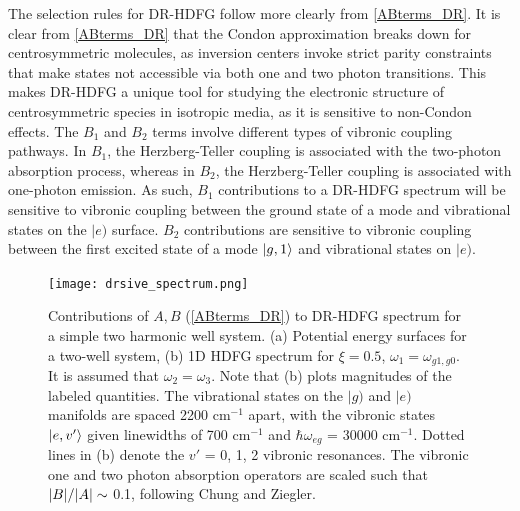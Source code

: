 \documentclass[aip, jcp, reprint, onecolumn]{revtex4-2}
\begin{document}
The selection rules for DR-HDFG follow more clearly from \autoref{ABterms_DR}.
It is clear from \autoref{ABterms_DR} that the Condon approximation breaks down for centrosymmetric molecules, as inversion centers invoke strict parity constraints that make states not accessible via both one and two photon transitions. \cite{Milojevich2013, RN230}
This makes DR-HDFG a unique tool for studying the electronic structure of centrosymmetric species in isotropic media, as it is sensitive to non-Condon effects. \cite{Olson2018}
The $B_1$ and $B_2$ terms involve different types of vibronic coupling pathways.
In $B_1$, the Herzberg-Teller coupling is associated with the two-photon absorption process, whereas in $B_2$, the Herzberg-Teller coupling is associated with one-photon emission.
As such, $B_1$ contributions to a DR-HDFG spectrum will be sensitive to vibronic coupling between the ground state of a mode and vibrational states on the $|e)$ surface. 
$B_2$ contributions are sensitive to vibronic coupling between the first excited state of a mode $\ket{g,1}$ and vibrational states on $|e)$.

\begin{figure}[!htbp]
	\centering
	\texttt{[image: drsive\_spectrum.png]}
	\caption{Contributions of $A, B$ (\autoref{ABterms_DR}) to DR-HDFG spectrum for a simple two harmonic well system.
		(a) Potential energy surfaces for a two-well system, (b) 1D HDFG spectrum for $\xi = 0.5$, $\omega_1 = \omega_{g1, g0}$. 
		It is assumed that $\omega_2 = \omega_3$.
		Note that (b) plots magnitudes of the labeled quantities.
		The vibrational states on the $|g)$ and $|e)$ manifolds are spaced 2200 cm$^{-1}$ apart, with the vibronic states $\ket{e,v'}$ given linewidths of 700 cm$^{-1}$ and $\hbar \omega_{eg}$ = 30000 cm$^{-1}$.
		Dotted lines in (b) denote the $v'$ = 0, 1, 2 vibronic resonances. 
		The vibronic one and two photon absorption operators are scaled such that $\abs{B}/\abs{A} \sim$ 0.1, following Chung and Ziegler. \cite{Ziegler1988}}
	\label{fig:doubres_spec}
\end{figure}
\end{document}
